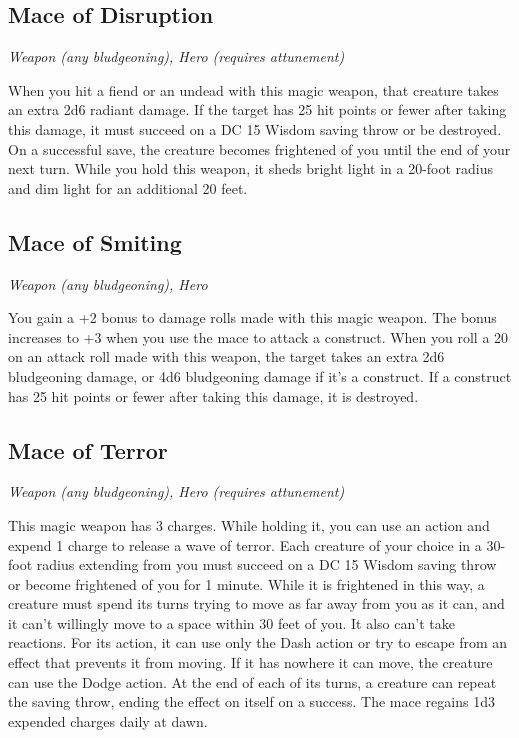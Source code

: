\subsection{Mace of Disruption}
\textit{Weapon (any bludgeoning), Hero (requires attunement)} 

When you hit a fiend or an undead with this magic weapon, that creature takes an extra 2d6 radiant damage. If the target has 25 hit points or fewer after taking this damage, it must succeed on a DC 15 Wisdom saving throw or be destroyed. On a successful save, the creature becomes frightened of you until the end of your next turn.  While you hold this weapon, it sheds bright light in a 20-foot radius and dim light for an additional 20 feet.

\subsection{Mace of Smiting}
\textit{Weapon (any bludgeoning), Hero}

You gain a +2 bonus to damage rolls made with this magic weapon. The bonus increases to +3 when you use the mace to attack a construct.  When you roll a 20 on an attack roll made with this weapon, the target takes an extra 2d6 bludgeoning damage, or 4d6 bludgeoning damage if it's a construct. If a construct has 25 hit points or fewer after taking this damage, it is destroyed.

\subsection{Mace of Terror}
\textit{Weapon (any bludgeoning), Hero (requires attunement)} 

This magic weapon has 3 charges. While holding it, you can use an action and expend 1 charge to release a wave of terror. Each creature of your choice in a 30-foot radius extending from you must succeed on a DC 15 Wisdom saving throw or become frightened of you for 1 minute. While it is frightened in this way, a creature must spend its turns trying to move as far away from you as it can, and it can't willingly move to a space within 30 feet of you. It also can't take reactions. For its action, it can use only the Dash action or try to escape from an effect that prevents it from moving. If it has nowhere it can move, the creature can use the Dodge action. At the end of each of its turns, a creature can repeat the saving throw, ending the effect on itself on a success. The mace regains 1d3 expended charges daily at dawn.

